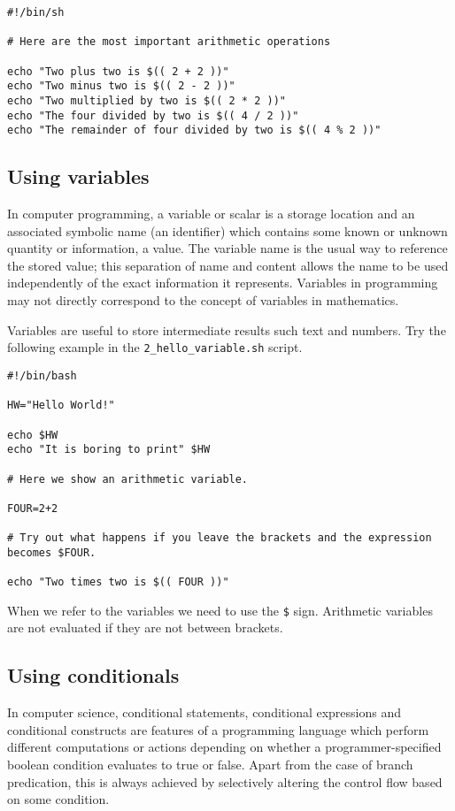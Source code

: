 \documentclass{article}\usepackage[]{graphicx}\usepackage[usenames,dvipsnames]{color}
\begin{document}
\begin{verbatim}
#!/bin/sh

# Here are the most important arithmetic operations

echo "Two plus two is $(( 2 + 2 ))"
echo "Two minus two is $(( 2 - 2 ))"
echo "Two multiplied by two is $(( 2 * 2 ))"
echo "The four divided by two is $(( 4 / 2 ))"
echo "The remainder of four divided by two is $(( 4 % 2 ))"
\end{verbatim}

\subsection*{Using variables}

In computer programming, a variable or scalar is a storage location and an associated symbolic name (an identifier) which contains some known or unknown quantity or information, a value. The variable name is the usual way to reference the stored value; this separation of name and content allows the name to be used independently of the exact information it represents. Variables in programming may not directly correspond to the concept of variables in mathematics.

Variables are useful to store intermediate results such text and numbers. Try the following example in the \verb+2_hello_variable.sh+ script.

\begin{verbatim}
#!/bin/bash

HW="Hello World!"

echo $HW
echo "It is boring to print" $HW

# Here we show an arithmetic variable.

FOUR=2+2

# Try out what happens if you leave the brackets and the expression becomes $FOUR.

echo "Two times two is $(( FOUR ))"

\end{verbatim}

When we refer to the variables we need to use the \verb+$+ sign. Arithmetic variables are not evaluated if they are not between brackets.

\subsection*{Using conditionals}

In computer science, conditional statements, conditional expressions and conditional constructs are features of a programming language which perform different computations or actions depending on whether a programmer-specified boolean condition evaluates to true or false. Apart from the case of branch predication, this is always achieved by selectively altering the control flow based on some condition.
\end{document}
